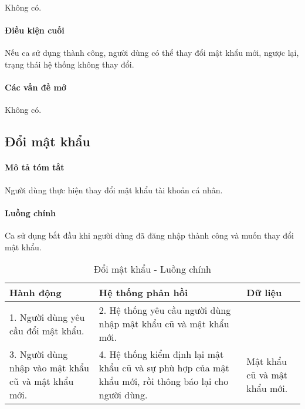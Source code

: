 \documentclass[./../main.tex]{subfiles}
\begin{document}
Không có.

\paragraph*{Điều kiện cuối}

Nếu ca sử dụng thành công, người dùng có thể thay đổi mật khẩu mới,
ngược lại, trạng thái hệ thống không thay đổi.

\paragraph*{Các vấn đề mở}

Không có.

\subsection{Đổi mật khẩu}

\paragraph*{Mô tả tóm tắt}

Người dùng thực hiện thay đổi mật khẩu tài khoản cá nhân.


\paragraph*{Luồng chính} Ca sử dụng bắt đầu khi người dùng đã đăng nhập thành công và muốn thay đổi mật khẩu.

\begin{table}[H]
  \caption{Đổi mật khẩu - Luồng chính}
  \label{tab:change_password}
  \begin{tabularx}{\textwidth}{|X|X|X|}
  \hline
  \textbf{Hành động}                               & \textbf{Hệ thống phản hồi}                                                                           & \textbf{Dữ liệu}             \\ \hline
  1. Người dùng yêu cầu đổi mật khẩu.                 & 2. Hệ thống yêu cầu người dùng nhập mật khẩu cũ và mật khẩu mới.                                        &                              \\ \hline
  3. Người dùng nhập vào mật khẩu cũ và mật khẩu mới. & 4. Hệ thống kiểm định lại mật khẩu cũ và sự phù hợp của mật khẩu mới, rồi thông báo lại cho người dùng. & Mật khẩu cũ và mật khẩu mới. \\ \hline
  \end{tabularx}
\end{table}
\end{document}
